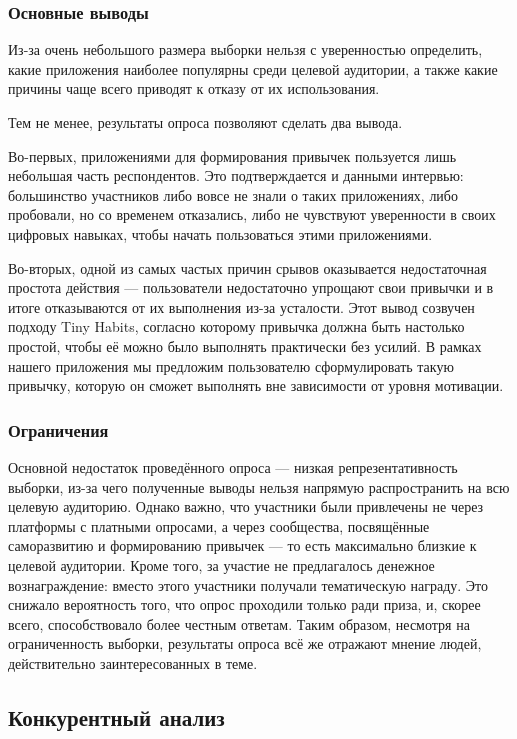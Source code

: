 \documentclass[pdflatex,sn-mathphys-num]{sn-jnl}%
\theoremstyle{thmstyleone}%
\theoremstyle{thmstyletwo}%
\theoremstyle{thmstylethree}%
\begin{document}
\subsubsection{Основные выводы}

Из-за очень небольшого размера выборки нельзя с уверенностью определить, какие приложения наиболее популярны среди целевой аудитории, а также какие причины чаще всего приводят к отказу от их использования.

Тем не менее, результаты опроса позволяют сделать два вывода. 

Во-первых, приложениями для формирования привычек пользуется лишь небольшая часть респондентов. Это подтверждается и данными интервью: большинство участников либо вовсе не знали о таких приложениях, либо пробовали, но со временем отказались, либо не чувствуют уверенности в своих цифровых навыках, чтобы начать пользоваться этими приложениями.

Во-вторых, одной из самых частых причин срывов оказывается недостаточная простота действия — пользователи недостаточно упрощают свои привычки и в итоге отказываются от их выполнения из-за усталости. Этот вывод созвучен подходу Tiny Habits, согласно которому привычка должна быть настолько простой, чтобы её можно было выполнять практически без усилий. В рамках нашего приложения мы предложим пользователю сформулировать такую привычку, которую он сможет выполнять вне зависимости от уровня мотивации.

\subsubsection{Ограничения}

Основной недостаток проведённого опроса — низкая репрезентативность выборки, из-за чего полученные выводы нельзя напрямую распространить на всю целевую аудиторию. Однако важно, что участники были привлечены не через платформы с платными опросами, а через сообщества, посвящённые саморазвитию и формированию привычек — то есть максимально близкие к целевой аудитории. Кроме того, за участие не предлагалось денежное вознаграждение: вместо этого участники получали тематическую награду. Это снижало вероятность того, что опрос проходили только ради приза, и, скорее всего, способствовало более честным ответам. Таким образом, несмотря на ограниченность выборки, результаты опроса всё же отражают мнение людей, действительно заинтересованных в теме.

\subsection{Конкурентный анализ}\label{Competitor Analysis}
\end{document}
